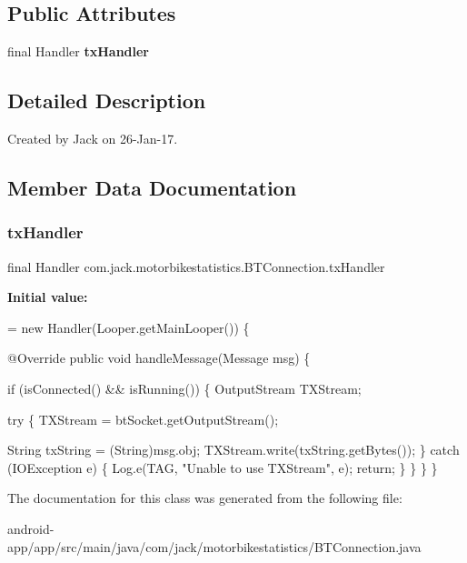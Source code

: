 \subsection*{Public Attributes}
\begin{DoxyCompactItemize}
\item 
final Handler {\bfseries tx\+Handler}
\end{DoxyCompactItemize}


\subsection{Detailed Description}
Created by Jack on 26-\/\+Jan-\/17. 

\subsection{Member Data Documentation}
\mbox{\label{classcom_1_1jack_1_1motorbikestatistics_1_1_b_t_connection_a7a88b2007af6a9a5c8667a9f1df980cc}} 
\subsubsection{\texorpdfstring{tx\+Handler}{txHandler}}
{\footnotesize\ttfamily final Handler com.\+jack.\+motorbikestatistics.\+B\+T\+Connection.\+tx\+Handler}

{\bfseries Initial value\+:}
\begin{DoxyCode}
= \textcolor{keyword}{new} Handler(Looper.getMainLooper()) \{

        @Override
        \textcolor{keyword}{public} \textcolor{keywordtype}{void} handleMessage(Message msg) \{

            
            \textcolor{keywordflow}{if} (isConnected() && isRunning()) \{
                OutputStream TXStream;

                
                \textcolor{keywordflow}{try} \{
                    TXStream = btSocket.getOutputStream();

                    String txString = (String)msg.obj;
                    TXStream.write(txString.getBytes());
                \} \textcolor{keywordflow}{catch} (IOException e) \{
                    Log.e(TAG, \textcolor{stringliteral}{"Unable to use TXStream"}, e);
                    \textcolor{keywordflow}{return};
                \}
            \}
        \}
    \}
\end{DoxyCode}


The documentation for this class was generated from the following file\+:\begin{DoxyCompactItemize}
\item 
android-\/app/app/src/main/java/com/jack/motorbikestatistics/B\+T\+Connection.\+java\end{DoxyCompactItemize}
